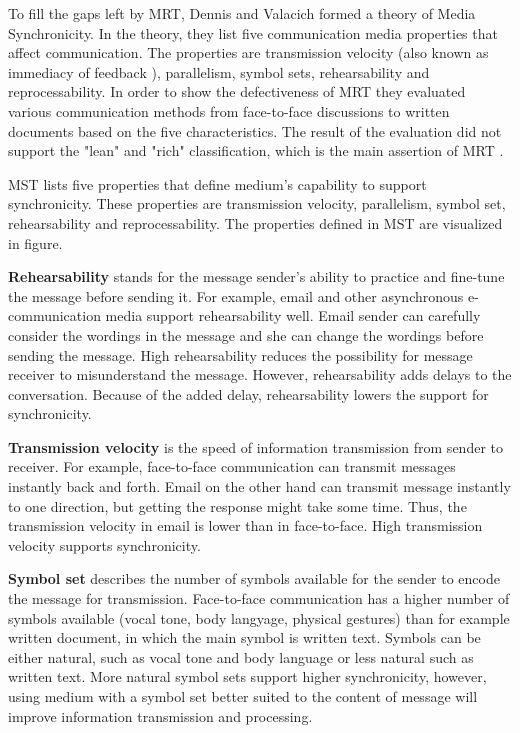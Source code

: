 \documentclass[english,12pt,a4paper,pdftex]{article}
\begin{document}
To fill the gaps left by \ac{MRT}, Dennis and Valacich formed a theory of Media Synchronicity. In the theory, they list five communication media properties that affect communication. The properties are transmission velocity (also known as immediacy of feedback \citep{dennis1999}), parallelism, symbol sets, rehearsability and reprocessability. In order to show the defectiveness of \ac{MRT} they evaluated various communication methods from face-to-face discussions to written documents based on the five characteristics. The result of the evaluation did not support the "lean" and "rich" classification, which is the main assertion of \ac{MRT} \citep{dennis2008}.

\Ac{MST} lists five properties that define medium's capability to support synchronicity. These properties are transmission velocity, parallelism, symbol set, rehearsability and reprocessability. The properties defined in \ac{MST} are visualized in figure.

\textbf{Rehearsability} stands for the message sender's ability to practice and fine-tune the message before sending it. For example, email and other asynchronous e-communication media support rehearsability well. Email sender can carefully consider the wordings in the message and she can change the wordings before sending the message. High rehearsability reduces the possibility for message receiver to misunderstand the message. However, rehearsability adds delays to the conversation. Because of the added delay, rehearsability lowers the support for synchronicity.

\textbf{Transmission velocity} is the speed of information transmission from sender to receiver. For example, face-to-face communication can transmit messages instantly back and forth. Email on the other hand can transmit message instantly to one direction, but getting the response might take some time. Thus, the transmission velocity in email is lower than in face-to-face. High transmission velocity supports synchronicity.

\textbf{Symbol set} describes the number of symbols available for the sender to encode the message for transmission. Face-to-face communication has a higher number of symbols available (vocal tone, body langyage, physical gestures) than for example written document, in which the main symbol is written text. Symbols can be either natural, such as vocal tone and body language or less natural such as written text. More natural symbol sets support higher synchronicity, however, using medium with a symbol set better suited to the content of message will improve information transmission and processing.
\end{document}
